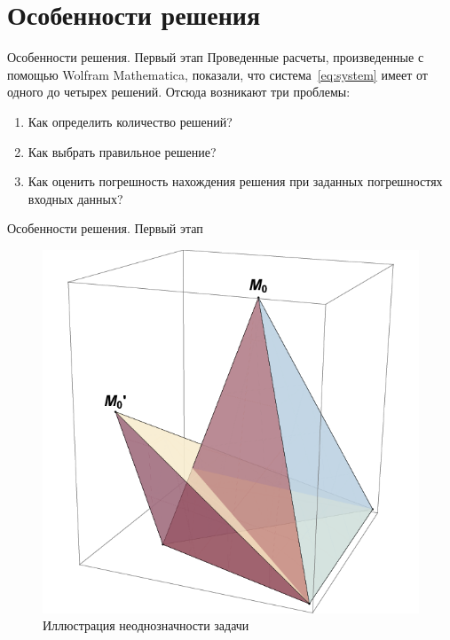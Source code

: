 \documentclass[russian,hyperref={unicode}]{beamer}
\begin{document}
  \section{Особенности решения}
  \begin{frame}{Особенности решения. Первый этап}
    Проведенные расчеты, произведенные с помощью Wolfram Mathematica, показали, что система~\eqref{eq:system} имеет от одного до четырех решений. Отсюда возникают три проблемы:
    \begin{enumerate}
      \item Как определить количество решений? \label{q:1}
      \item Как выбрать правильное решение? \label{q:2}
      \item Как оценить погрешность нахождения решения при заданных погрешностях входных данных? \label{q:3}
    \end{enumerate}

  \end{frame}

  \begin{frame}{Особенности решения. Первый этап}
    \begin{figure}
      \begin{center}
        \includegraphics[width=.8\textheight]{pyramids}

        \caption{Иллюстрация неоднозначности задачи}
      \end{center}
    \end{figure}
  \end{frame}
\end{document}

